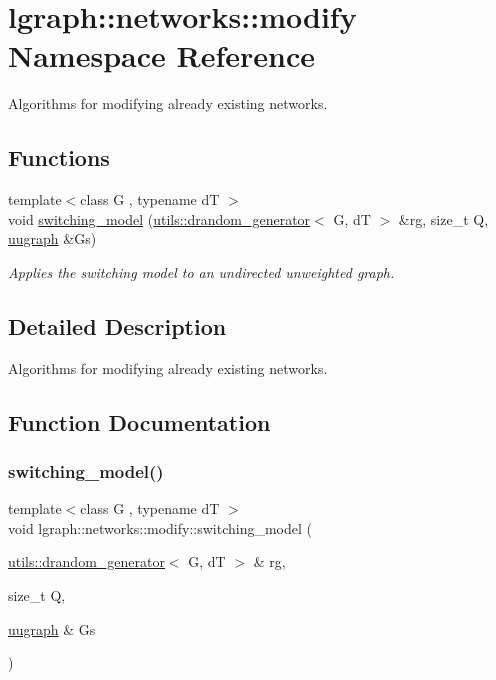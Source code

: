 \hypertarget{namespacelgraph_1_1networks_1_1modify}{}\section{lgraph\+:\+:networks\+:\+:modify Namespace Reference}
\label{namespacelgraph_1_1networks_1_1modify}


Algorithms for modifying already existing networks.  


\subsection*{Functions}
\begin{DoxyCompactItemize}
\item 
{\footnotesize template$<$class G , typename dT $>$ }\\void \hyperlink{namespacelgraph_1_1networks_1_1modify_a70c6b5acd27230191d4d82baecdfb740}{switching\+\_\+model} (\hyperlink{classlgraph_1_1utils_1_1drandom__generator}{utils\+::drandom\+\_\+generator}$<$ G, dT $>$ \&rg, size\+\_\+t Q, \hyperlink{classlgraph_1_1uugraph}{uugraph} \&Gs)
\begin{DoxyCompactList}\small\item\em Applies the switching model to an undirected unweighted graph. \end{DoxyCompactList}\end{DoxyCompactItemize}


\subsection{Detailed Description}
Algorithms for modifying already existing networks. 

\subsection{Function Documentation}
\mbox{\label{namespacelgraph_1_1networks_1_1modify_a70c6b5acd27230191d4d82baecdfb740}} 
\subsubsection{\texorpdfstring{switching\+\_\+model()}{switching\_model()}}
{\footnotesize\ttfamily template$<$class G , typename dT $>$ \\
void lgraph\+::networks\+::modify\+::switching\+\_\+model (\begin{DoxyParamCaption}\item[{\hyperlink{classlgraph_1_1utils_1_1drandom__generator}{utils\+::drandom\+\_\+generator}$<$ G, dT $>$ \&}]{rg,  }\item[{size\+\_\+t}]{Q,  }\item[{\hyperlink{classlgraph_1_1uugraph}{uugraph} \&}]{Gs }\end{DoxyParamCaption})}



